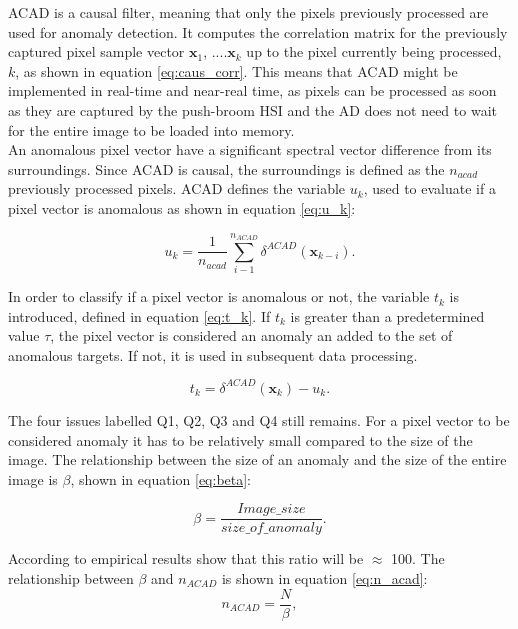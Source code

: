 ACAD is a causal filter, meaning that only the pixels previously processed are used for anomaly detection.  It computes the correlation matrix for the previously captured pixel sample vector {$\textbf{x}_1$, ....$\textbf{x}_k$} up to the pixel currently being processed, $k$, as shown in equation \ref{eq:caus_corr}. This means that ACAD might be implemented in real-time and near-real time, as pixels can be processed as soon as they are captured by the push-broom HSI and the AD does not need to wait for the entire image to be loaded into memory. \\

An anomalous pixel vector have a significant spectral vector difference from its surroundings. Since ACAD is causal, the surroundings is defined as the $n_{acad}$ previously processed pixels. %
ACAD defines the variable $u_k$, used to evaluate if a pixel vector is anomalous as shown in  equation \ref{eq:u_k}: 

\begin{equation}
    u_k = \frac{1}{n_{acad}}\sum_{i-1}^{n_{ACAD}}  \delta^{ACAD}(\textbf{x}_{k-i}).
    \label{eq:u_k}
\end{equation}

 In order to classify if a pixel vector is anomalous or not, the variable $t_k$ is introduced, defined in equation \ref{eq:t_k}. If $t_k$ is greater than a predetermined value $\tau$, the pixel vector is considered an anomaly an added to the set of anomalous targets. If not, it is used in subsequent data processing. 

\begin{equation}
    t_k = \delta^{ACAD}(\textbf{x}_{k}) - u_k.
    \label{eq:t_k}
\end{equation}


The four issues labelled Q1, Q2, Q3 and Q4 still remains. For a pixel vector to be considered anomaly it has to be relatively small compared to the size of the image. The relationship between the size of an anomaly and the size of the entire image is $\beta$, shown in equation \ref{eq:beta}:

\begin{equation}
    \beta  = \frac{Image\_size}{size\_of\_anomaly}.
    \label{eq:beta}
\end{equation}

According to \cite{chang2006characterization} empirical results show that this ratio will be $\approx$ 100.
The relationship between $\beta$ and $n_{ACAD}$ is shown in equation \ref{eq:n_acad}:
\begin{equation}
    n_{ACAD} = \frac{N}{\beta},
    \label{eq:n_acad}
\end{equation}

